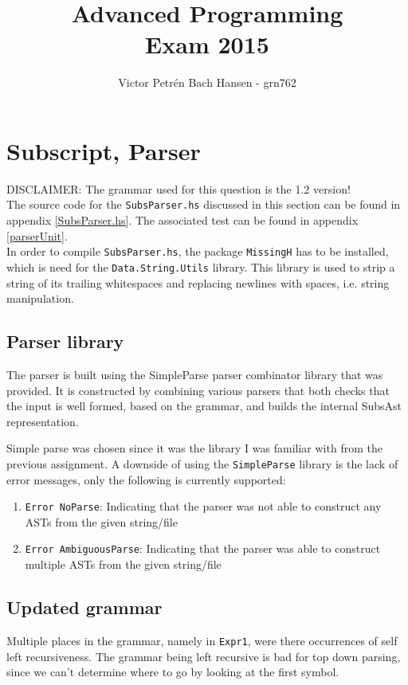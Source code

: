 \documentclass[a4paper]{article}
\author{Victor Petrén Bach Hansen - grn762}
\title{Advanced Programming \\ Exam 2015}
\begin{document}
\maketitle
\tableofcontents
\section{Subscript, Parser}
DISCLAIMER: The grammar used for this question is the 1.2 version!\\

The source code for the \texttt{SubsParser.hs} discussed in this section can be found in appendix \ref{SubsParser.hs}. The associated test can be found in appendix \ref{parserUnit}.\\

In order to compile \texttt{SubsParser.hs}, the package \texttt{MissingH} has to be installed, which is need for the \texttt{Data.String.Utils} library. This library is used to strip a string of its trailing whitespaces and replacing newlines with spaces, i.e. string manipulation.
\subsection{Parser library}
\label{sub:Parser library}
The parser is built using the SimpleParse parser combinator library that was provided. It is constructed by combining various parsers that both checks that the input is well formed, based on the grammar, and builds the internal SubsAst representation.

Simple parse was chosen since it was the library I was familiar with from the previous assignment. A downside of using the \texttt{SimpleParse} library is the lack of error messages, only the following is currently supported:
\begin{enumerate}
  \item \texttt{Error NoParse}:
    Indicating that the parser was not able to construct any ASTs from the given string/file
  \item \texttt{Error AmbiguousParse}:
    Indicating that the parser was able to construct multiple ASTs from the given string/file
\end{enumerate}
\subsection{Updated grammar}
\label{sub:Updated grammar}
Multiple places in the grammar, namely in \texttt{Expr1}, were there occurrences of self left recursiveness. The grammar being left recursive is bad for top down parsing, since we can't determine where to go by looking at the first symbol.
\end{document}
